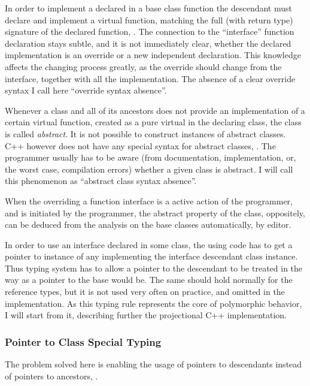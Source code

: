 In order to implement a declared in a base class function the descendant must declare and implement
a virtual function, matching the full (with return type) signature of the declared function, . The connection 
to the ``interface'' function declaration stays subtle, and it is not immediately clear, whether the 
declared implementation is an override or a new independent declaration. This knowledge affects the 
changing process greatly, as the override should change from the interface, together with all the implementation.
The absence of a clear override syntax I call here ``override syntax absence''.

Whenever a class and all of its ancestors does not provide an implementation of a certain virtual function,
created as a pure virtual in the declaring class, the class is called \emph{abstract}. It is not possible
to construct instances of abstract classes. C++ however does not have any special syntax for abstract classes,  .
The programmer usually has to be aware (from documentation, implementation, or, the worst case, compilation
errors) whether a given class is abstract. I will call this phenomenon as ``abstract class syntax absence''.

When the overriding a function interface is a active action of the programmer, and is initiated by the 
programmer, the abstract property of the class, oppositely, can be deduced from the analysis on 
the base classes automatically, by editor.

In order to use an interface declared in some class, the using code has to get a pointer to instance
of any implementing the interface descendant class instance. Thus typing system has to allow a pointer
to the descendant to be treated in the way as a pointer to the base would be. The same should hold 
normally for the reference types, but it is not used very often on practice, and omitted in the implementation.
As this typing rule represents the core of polymorphic behavior, I will start from it, describing further the
projectional C++ implementation.

\subsubsection{Pointer to Class Special Typing}

The problem solved here is enabling the usage of pointers to descendants instead of pointers to ancestors,
.


